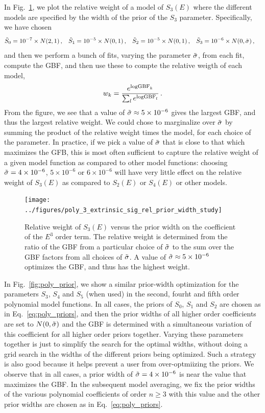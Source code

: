 \documentclass[prd,11pt,superscriptaddress,notitlepage,tightenlines,nofootinbib,floatfix]{revtex4-1}
\begin{document}
In Fig.~\ref{fig:poly_3_prior}, we plot the relative weight of a model of $S_3(E)$ where the different models are specified by the width of the prior of the $S_3$ parameter.  Specifically, we have chosen
\begin{align}\label{eq:poly_priors}
&\tilde{S}_0 = 10^{-7}\times N(2,1)\, ,&
&\tilde{S}_1 = 10^{-5}\times N(0,1)\, ,&
&\tilde{S}_2 = 10^{-5}\times N(0,1)\, ,&
&\tilde{S}_3 = 10^{-6}\times N(0, \tilde{{\sigma}})\, ,&
\end{align}
and then we perform a bunch of fits, varying the parameter $\tilde{{\sigma}}$, from each fit, compute the GBF, and then use these to compte the relative weigth of each model,
\begin{equation}
w_k = \frac{e^{{\rm logGBF}_k}}{\sum_l e^{{\rm logGBF}_l}}\, .
\end{equation}
From the figure, we see that a value of $\tilde{{\sigma}}\approx5\times10^{-6}$ gives the largest GBF, and thus the largest relative weight.
We could chose to marginalize over $\tilde{{\sigma}}$ by summing the product of the relative weight times the model, for each choice of the parameter.
In practice, if we pick a value of $\tilde{{\sigma}}$ that is close to that which maximizes the GFB, this is most often sufficient to capture the relative weight of a given model function as compared to other model functions: choosing $\tilde{{\sigma}} = 4\times10^{-6}$, $5\times10^{-6}$ or $6\times10^{-6}$ will have very little effect on the relative weight of $S_3(E)$ as compared to $S_2(E)$ or $S_4(E)$ or other models.

\begin{figure}
\texttt{[image: ../figures/poly\_3\_extrinsic\_sig\_rel\_prior\_width\_study]}
\caption{\label{fig:poly_3_prior}
Relative weight of $S_3(E)$ versus the prior width on the coefficient of the $E^3$ order term.
The relative weight is determined from the ratio of the GBF from a particular choice of $\tilde{{\sigma}}$ to the sum over the GBF factors from all choices of $\tilde{{\sigma}}$.  A value of $\tilde{{\sigma}}\approx5\times10^{-6}$ optimizes the GBF, and thus has the highest weight.}
\end{figure}


In Fig.~\ref{fig:poly_prior}, we show a similar prior-width optimization for the parameters $S_3$, $S_4$ and $S_5$ (when used) in the second, fourht and fifth order polynomial model functions.  In all cases, the priors of $S_0$, $S_1$ and $S_2$ are chosen as in Eq.~\eqref{eq:poly_priors}, and then the prior widths of all higher order coefficients are set to $N(0,\tilde{{\sigma}})$ and the GBF is determined with a simultaneous variation of this coefficient for all higher order priors together.
Varying these parameters together is just to simplify the search for the optimal widths, without doing a grid search in the widths of the different priors being optimized.  Such a strategy is also good because it helps prevent a user from over-optmiizing the priors.
We observe that in all cases, a prior width of $\tilde{{\sigma}}=4\times10^{-6}$ is near the value that maximizes the GBF.
In the subsequent model averaging, we fix the prior widths of the various polynomial coefficients of order $n\geq3$ with this value and the other prior widths are chosen as in Eq.~\eqref{eq:poly_priors}.
\end{document}
